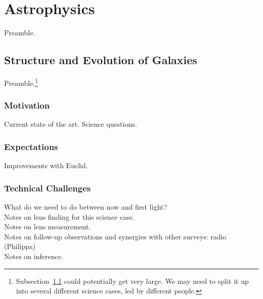 \documentclass[twocolumn]{svjour3}
\begin{document}

\section{Astrophysics}



Preamble.



\subsection{Structure and Evolution of Galaxies}
\label{sec:lensgalaxies}



Preamble.\footnote{Subsection~\ref{sec:lensgalaxies} could potentially
get very large. We may need to split it up into several different
science cases, led by different people.}

\subsubsection{Motivation}
Current state of the art. Science questions.\\

\subsubsection{Expectations}
Improvements with Euclid.\\

\subsubsection{Technical Challenges}
What do we need to do between now and first light?\\
Notes on lens finding for this science case.\\
Notes on lens measurement.\\
Notes on follow-up observations and synergies with other surveys: radio
(Philippa) \\
Notes on inference.\\
\end{document}
